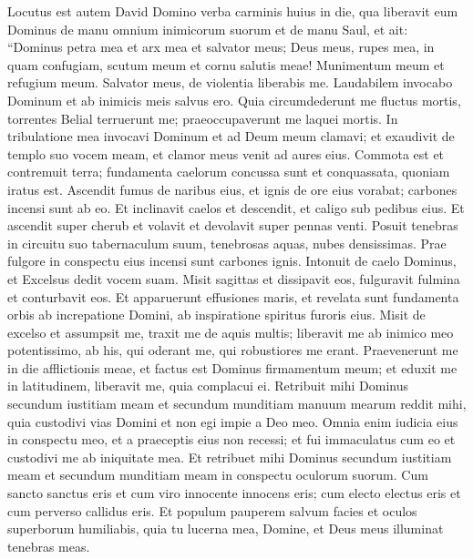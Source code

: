 \begin{biblechapter}  
\verse Locutus est autem David Domino verba carminis huius in die, qua liberavit eum Dominus de manu omnium inimicorum suorum et de manu Saul, 
\verse et ait: “Dominus petra mea et arx mea et salvator meus; 
\verse Deus meus, rupes mea, in quam confugiam, scutum meum et cornu salutis meae! Munimentum meum et refugium meum. Salvator meus, de violentia liberabis me. 
\verse Laudabilem invocabo Dominum et ab inimicis meis salvus ero. 
\verse Quia circumdederunt me fluctus mortis, torrentes Belial terruerunt me; 
\verse praeoccupaverunt me laquei mortis. 
\verse In tribulatione mea invocavi Dominum et ad Deum meum clamavi; et exaudivit de templo suo vocem meam, et clamor meus venit ad aures eius. 
\verse Commota est et contremuit terra; fundamenta caelorum concussa sunt et conquassata, quoniam iratus est. 
\verse Ascendit fumus de naribus eius, et ignis de ore eius vorabat; carbones incensi sunt ab eo. 
\verse Et inclinavit caelos et descendit, et caligo sub pedibus eius. 
\verse Et ascendit super cherub et volavit et devolavit super pennas venti. 
\verse Posuit tenebras in circuitu suo tabernaculum suum, tenebrosas aquas, nubes densissimas. 
\verse Prae fulgore in conspectu eius incensi sunt carbones ignis. 
\verse Intonuit de caelo Dominus, et Excelsus dedit vocem suam. 
\verse Misit sagittas et dissipavit eos, fulguravit fulmina et conturbavit eos. 
\verse Et apparuerunt effusiones maris, et revelata sunt fundamenta orbis ab increpatione Domini, ab inspiratione spiritus furoris eius. 
\verse Misit de excelso et assumpsit me, traxit me de aquis multis; 
\verse liberavit me ab inimico meo potentissimo, ab his, qui oderant me, qui robustiores me erant. 
\verse Praevenerunt me in die afflictionis meae, et factus est Dominus firmamentum meum; 
\verse et eduxit me in latitudinem, liberavit me, quia complacui ei. 
\verse Retribuit mihi Dominus secundum iustitiam meam et secundum munditiam manuum mearum reddit mihi, 
\verse quia custodivi vias Domini et non egi impie a Deo meo. 
\verse Omnia enim iudicia eius in conspectu meo, et a praeceptis eius non recessi; 
\verse et fui immaculatus cum eo et custodivi me ab iniquitate mea. 
\verse Et retribuet mihi Dominus secundum iustitiam meam et secundum munditiam meam in conspectu oculorum suorum. 
\verse Cum sancto sanctus eris et cum viro innocente innocens eris; 
\verse cum electo electus eris et cum perverso callidus eris. 
\verse Et populum pauperem salvum facies et oculos superborum humiliabis, 
\verse quia tu lucerna mea, Domine, et Deus meus illuminat tenebras meas. 

\end{biblechapter}
